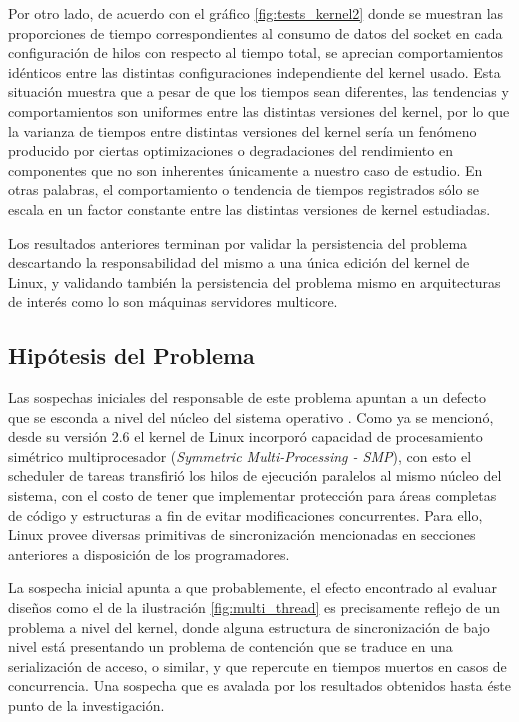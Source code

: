 Por otro lado, de acuerdo con el gráfico \ref{fig:tests_kernel2} donde se muestran las proporciones de tiempo correspondientes al consumo de datos del socket en cada configuración de hilos con respecto al tiempo total, se aprecian comportamientos idénticos entre las distintas configuraciones independiente del kernel usado. Esta situación muestra que a pesar de que los tiempos sean diferentes, las tendencias y comportamientos son uniformes entre las distintas versiones del kernel, por lo que la varianza de tiempos entre distintas versiones del kernel sería un fenómeno producido por ciertas optimizaciones o degradaciones del rendimiento en componentes que no son inherentes únicamente a nuestro caso de estudio. En otras palabras, el comportamiento o tendencia de tiempos registrados sólo se escala en un factor constante entre las distintas versiones de kernel estudiadas.

Los resultados anteriores terminan por validar la persistencia del problema descartando la responsabilidad del mismo a una única edición del kernel de Linux, y validando también la persistencia del problema mismo en arquitecturas de interés como lo son máquinas servidores multicore.

\subsection{Hipótesis del Problema}
Las sospechas iniciales del responsable de este problema apuntan a un defecto que se esconda a nivel del núcleo del sistema operativo \cite{paper:toshiba,post:facebook}. Como ya se mencionó, desde su versión 2.6 el kernel de Linux incorporó capacidad de procesamiento simétrico multiprocesador (\emph{Symmetric Multi-Processing - SMP}), con esto el scheduler de tareas transfirió los hilos de ejecución paralelos al mismo núcleo del sistema, con el costo de tener que implementar protección para áreas completas de código y estructuras a fin de evitar modificaciones concurrentes. Para ello, Linux provee diversas primitivas de sincronización mencionadas en secciones anteriores a disposición de los programadores.

La sospecha inicial apunta a que probablemente, el efecto encontrado al evaluar diseños como el de la ilustración \ref{fig:multi_thread} es precisamente reflejo de un problema a nivel del kernel, donde alguna estructura de sincronización de bajo nivel está presentando un problema de contención que se traduce en una serialización de acceso, o similar, y que repercute en tiempos muertos en casos de concurrencia. Una sospecha que es avalada por los resultados obtenidos hasta éste punto de la investigación.

